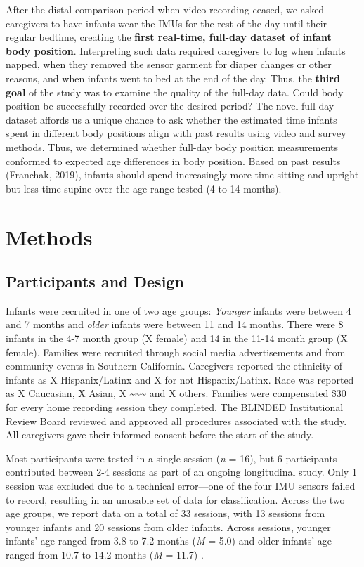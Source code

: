 \documentclass[
  man]{apa6}
\begin{document}
After the distal comparison period when video recording ceased, we asked caregivers to have infants wear the IMUs for the rest of the day until their regular bedtime, creating the \textbf{first real-time, full-day dataset of infant body position}. Interpreting such data required caregivers to log when infants napped, when they removed the sensor garment for diaper changes or other reasons, and when infants went to bed at the end of the day. Thus, the \textbf{third goal} of the study was to examine the quality of the full-day data. Could body position be successfully recorded over the desired period? The novel full-day dataset affords us a unique chance to ask whether the estimated time infants spent in different body positions align with past results using video and survey methods. Thus, we determined whether full-day body position measurements conformed to expected age differences in body position. Based on past results (Franchak, 2019), infants should spend increasingly more time sitting and upright but less time supine over the age range tested (4 to 14 months).

\hypertarget{methods}{%
\section{Methods}\label{methods}}

\hypertarget{participants-and-design}{%
\subsection{Participants and Design}\label{participants-and-design}}

Infants were recruited in one of two age groups: \emph{Younger} infants were between 4 and 7 months and \emph{older} infants were between 11 and 14 months. There were 8 infants in the 4-7 month group (X female) and 14 in the 11-14 month group (X female). Families were recruited through social media advertisements and from community events in Southern California. Caregivers reported the ethnicity of infants as X Hispanix/Latinx and X for not Hispanix/Latinx. Race was reported as X Caucasian, X Asian, X \textasciitilde\textasciitilde\textasciitilde{} and X others. Families were compensated \$30 for every home recording session they completed. The BLINDED Institutional Review Board reviewed and approved all procedures associated with the study. All caregivers gave their informed consent before the start of the study.

Most participants were tested in a single session (\emph{n} = 16), but 6 participants contributed between 2-4 sessions as part of an ongoing longitudinal study. Only 1 session was excluded due to a technical error---one of the four IMU sensors failed to record, resulting in an unusable set of data for classification. Across the two age groups, we report data on a total of 33 sessions, with 13 sessions from younger infants and 20 sessions from older infants. Across sessions, younger infants' age ranged from 3.8 to 7.2 months (\emph{M} = 5.0) and older infants' age ranged from 10.7 to 14.2 months (\emph{M} = 11.7) .
\end{document}
